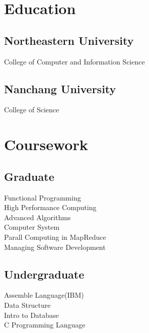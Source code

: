 \documentclass[letterpaper]{lyu-resume} %
\begin{document}
\begin{minipage}[t]{0.33\textwidth}
\section{Education} 

\subsection{Northeastern University}

College of Computer and Information Science

\sectionspace %


\subsection{Nanchang University}

College of Science

\sectionspace %


\section{Coursework}

\subsection{Graduate}

Functional Programming \\
High Performance Computing\\
Advanced Algorithms \\
Computer System \\
Parall Computing in MapReduce \\
Managing Software Development

\sectionspace %


\subsection{Undergraduate}

Assemble Language(IBM) \\
Data Structure \\
Intro to Database \\
C Programming Language

\sectionspace %


\end{minipage} %
\end{document}
